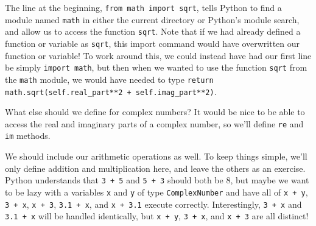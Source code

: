 \documentclass[m3380-lec-main.tex]{subfiles}
\begin{document}
\smallskip\noindent

The line at the beginning, \verb|from math import sqrt|, tells Python to find a module named \verb|math| in either the current directory or Python's module search, and allow us to access the function \verb|sqrt|. Note that if we had already defined a function or variable as \verb|sqrt|, this import command would have overwritten our function or variable! To work around this, we could instead have had our first line be simply \verb|import math|, but then when we wanted to use the function \verb|sqrt| from the \verb|math| module, we would have needed to type \verb|return math.sqrt(self.real_part**2 + self.imag_part**2)|.

What else should we define for complex numbers? It would be nice to be able to access the real and imaginary parts of a complex number, so we'll define \verb|re| and \verb|im| methods. 

\smallskip\noindent
We should include our arithmetic operations as well. To keep things simple, we'll only define addition and multiplication here, and leave the others as an exercise. Python understands that \verb|3 + 5| and \verb|5 + 3| should both be 8, but maybe we want to be lazy with a variables \verb|x| and \verb|y| of type \verb|ComplexNumber| and have all of \verb|x + y|, \verb|3 + x|, \verb|x + 3|, \verb|3.1 + x|, and \verb|x + 3.1| execute correctly. Interestingly, \verb|3 + x| and \verb|3.1 + x| will be handled identically, but \verb|x + y|, \verb|3 + x|, and \verb|x + 3| are all distinct!
\end{document}
